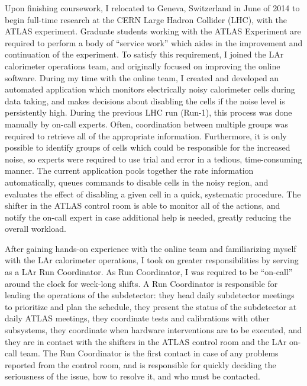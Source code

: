 Upon finishing coursework, I relocated to Geneva, Switzerland in June of 2014 to begin full-time research at the CERN Large Hadron Collider (LHC), with the ATLAS experiment. Graduate students working with the ATLAS Experiment are required to perform a body of ``service work'' which aides in the improvement and continuation of the experiment. To satisfy this requirement, I joined the LAr calorimeter operations team, and originally focused on improving the online software. During my time with the online team, I created and developed an automated application which monitors electrically noisy calorimeter cells during data taking, and makes decisions about disabling the cells if the noise level is persistently high. %
During the previous LHC run (Run-1), this process was done manually by on-call experts. Often, coordination between multiple groups was required to retrieve all of the appropriate information. Furthermore, it is only possible to identify groups of cells which could be responsible for the increased noise, so experts were required to use trial and error in a tedious, time-consuming manner. The current application pools together the rate information automatically, queues commands to disable cells in the noisy region, and evaluates the effect of disabling a given cell in a quick, systematic procedure. The shifter in the ATLAS control room is able to monitor all of the actions, and notify the on-call expert in case additional help is needed, greatly reducing the overall workload. 

After gaining hands-on experience with the online team and familiarizing myself with the LAr calorimeter operations, I took on greater responsibilities by serving as a LAr Run Coordinator. As Run Coordinator, I was required to be ``on-call'' around the clock for week-long shifts. A Run Coordinator is responsible for leading the operations of the subdetector: they head daily subdetector meetings to prioritize and plan the schedule, they present the status of the subdetector at daily ATLAS meetings, they coordinate tests and calibrations with other subsystems, they coordinate when hardware interventions are to be executed, and they are in contact with the shifters in the ATLAS control room and the LAr on-call team. The Run Coordinator is the first contact in case of any problems reported from the control room, and is responsible for quickly deciding the seriousness of the issue, how to resolve it, and who must be contacted. 


